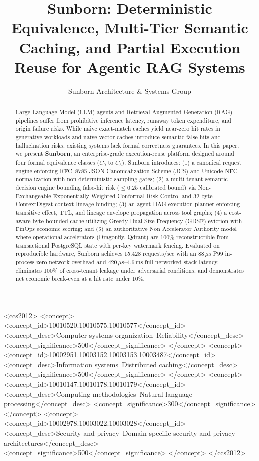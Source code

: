 \documentclass[sigconf,screen=true]{acmart}
\begin{document}
\title{Sunborn: Deterministic Equivalence, Multi-Tier Semantic Caching, and Partial Execution Reuse for Agentic RAG Systems}

\author{Sunborn Architecture \& Systems Group}

\begin{abstract}
Large Language Model (LLM) agents and Retrieval-Augmented Generation (RAG) pipelines suffer from prohibitive inference latency, runaway token expenditure, and origin failure risks. While naive exact-match caches yield near-zero hit rates in generative workloads and naive vector caches introduce semantic false hits and hallucination risks, existing systems lack formal correctness guarantees. In this paper, we present \textbf{Sunborn}, an enterprise-grade execution-reuse platform designed around four formal equivalence classes ($C_0$ to $C_3$). Sunborn introduces: (1) a canonical request engine enforcing RFC~8785 JSON Canonicalization Scheme (JCS) and Unicode NFC normalization with non-deterministic sampling gates; (2) a multi-tenant semantic decision engine bounding false-hit risk ($\le 0.25$ calibrated bound) via Non-Exchangeable Exponentially Weighted Conformal Risk Control and 32-byte ContextDigest context-lineage binding; (3) an agent DAG execution planner enforcing transitive effect, TTL, and lineage envelope propagation across tool graphs; (4) a cost-aware byte-bounded cache utilizing Greedy-Dual-Size-Frequency (GDSF) eviction with FinOps economic scoring; and (5) an authoritative Non-Accelerator Authority model where operational accelerators (Dragonfly, Qdrant) are 100\% reconstructible from transactional PostgreSQL state with per-key watermark fencing. Evaluated on reproducible hardware, Sunborn achieves 15,428 requests/sec with an 88\,$\mu$s P99 in-process zero-network overhead and 420\,$\mu$s--4.6\,ms full networked stack latency, eliminates 100\% of cross-tenant leakage under adversarial conditions, and demonstrates net economic break-even at a hit rate under 10\%.
\end{abstract}

\begin{CCSXML}
<ccs2012>
   <concept>
       <concept_id>10010520.10010575.10010577</concept_id>
       <concept_desc>Computer systems organization~Reliability</concept_desc>
       <concept_significance>500</concept_significance>
       </concept>
   <concept>
       <concept_id>10002951.10003152.10003153.10003487</concept_id>
       <concept_desc>Information systems~Distributed caching</concept_desc>
       <concept_significance>500</concept_significance>
       </concept>
   <concept>
       <concept_id>10010147.10010178.10010179</concept_id>
       <concept_desc>Computing methodologies~Natural language processing</concept_desc>
       <concept_significance>300</concept_significance>
       </concept>
   <concept>
       <concept_id>10002978.10003022.10003028</concept_id>
       <concept_desc>Security and privacy~Domain-specific security and privacy architectures</concept_desc>
       <concept_significance>500</concept_significance>
       </concept>
 </ccs2012>
\end{CCSXML}
\end{document}
